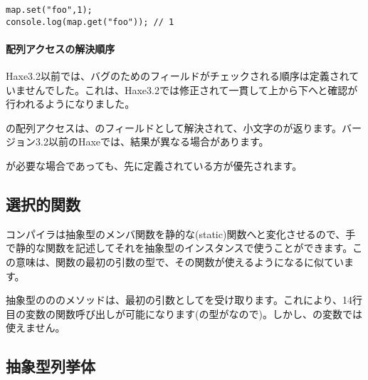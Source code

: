 \begin{lstlisting}
map.set("foo",1);
console.log(map.get("foo")); // 1
\end{lstlisting}

\paragraph{配列アクセスの解決順序}
\label{types-abstract-array-access-order}

Haxe3.2以前では、バグのためのフィールドがチェックされる順序は定義されていませんでした。これは、Haxe3.2では修正されて一貫して上から下へと確認が行われるようになりました。


の配列アクセスは、のフィールドとして解決されて、小文字のが返ります。バージョン3.2以前のHaxeでは、結果が異なる場合があります。

が必要な場合であっても、先に定義されている方が優先されます。

\subsection{選択的関数}
\label{types-abstract-selective-functions}

コンパイラは抽象型のメンバ関数を静的な(static)関数へと変化させるので、手で静的な関数を記述してそれを抽象型のインスタンスで使うことができます。この意味は、関数の最初の引数の型で、その関数が使えるようになるに似ています。


抽象型のののメソッドは、最初の引数としてを受け取ります。これにより、14行目の変数の関数呼び出しが可能になります(の型がなので)。しかし、の変数では使えません。



\subsection{抽象型列挙体}
\label{types-abstract-enum}

